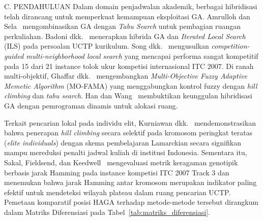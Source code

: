 \documentclass[letterpaper,12pt,oneside]{article}
\begin{document}
\begin{wordsection}{C. PENDAHULUAN}
Dalam domain penjadwalan akademik, berbagai hibridisasi telah dirancang untuk memperkuat kemampuan eksploitasi GA. Amrulloh dan Sela~\cite{amrulloh2021optimasi} mengombinasikan GA dengan \textit{Tabu Search} untuk pembagian ruangan perkuliahan. Badoni dkk.~\cite{badoni2023exploration} menerapkan hibrida GA dan \textit{Iterated Local Search} (ILS) pada persoalan UCTP kurikulum. Song dkk.~\cite{song2021competition} mengusulkan \textit{competition-guided multi-neighborhood local search} yang mencapai performa sangat kompetitif pada 15 dari 21 instance tolok ukur kompetisi internasional ITC 2007. Di ranah multi-objektif, Ghaffar dkk.~\cite{ghaffar2021multi} mengembangkan \textit{Multi-Objective Fuzzy Adaptive Memetic Algorithm} (MO-FAMA) yang menggabungkan kontrol fuzzy dengan \textit{hill climbing} dan \textit{tabu search}. Han dan Wang~\cite{han2025gradual} membuktikan keunggulan hibridisasi GA dengan pemrograman dinamis untuk alokasi ruang.

Terkait pencarian lokal pada individu elit, Kurniawan dkk.~\cite{kurniawan2025elite} mendemonstrasikan bahwa penerapan \textit{hill climbing} secara selektif pada kromosom peringkat teratas (\textit{elite individuals}) dengan skema pembelajaran Lamarckian secara signifikan mampu mereduksi penalti jadwal kuliah di institusi Indonesia. Sementara itu, Sakal, Fieldsend, dan Keedwell~\cite{sakal2023genotype} mengevaluasi metrik keragaman genotipik berbasis jarak Hamming pada instance kompetisi ITC 2007 Track 3 dan menemukan bahwa jarak Hamming antar kromosom merupakan indikator paling efektif untuk mendeteksi wilayah plateau dalam ruang pencarian UCTP. Pemetaan komparatif posisi HAGA terhadap metode-metode tersebut dirangkum dalam Matriks Diferensiasi pada Tabel~\ref{tab:matriks_diferensiasi}.


\end{wordsection}
\end{document}
